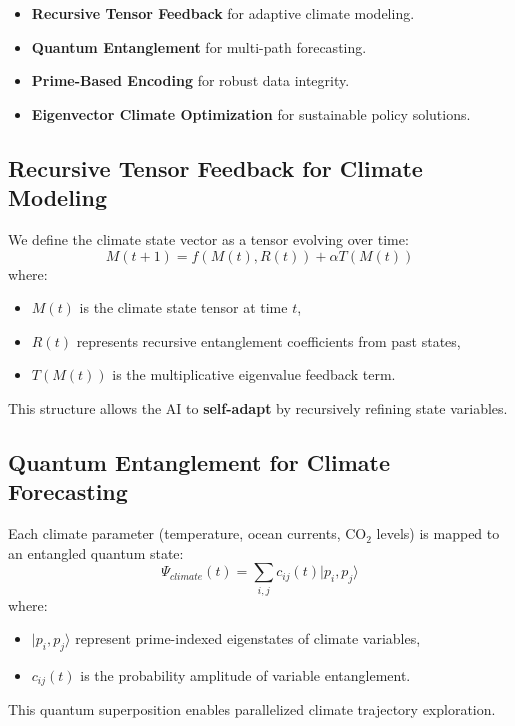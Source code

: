 \documentclass{article}
\theoremstyle{plain}
\begin{document}
\begin{itemize}
\begin{itemize}
\begin{itemize}
    \item \textbf{Recursive Tensor Feedback} for adaptive climate modeling.
    \item \textbf{Quantum Entanglement} for multi-path forecasting.
    \item \textbf{Prime-Based Encoding} for robust data integrity.
    \item \textbf{Eigenvector Climate Optimization} for sustainable policy solutions.
\end{itemize}

\subsection{Recursive Tensor Feedback for Climate Modeling}
We define the climate state vector as a tensor evolving over time:
\begin{equation}
    M(t+1) = f(M(t), R(t)) + \alpha T(M(t))
\end{equation}
where:
\begin{itemize}
    \item \( M(t) \) is the climate state tensor at time \( t \),
    \item \( R(t) \) represents recursive entanglement coefficients from past states,
    \item \( T(M(t)) \) is the multiplicative eigenvalue feedback term.
\end{itemize}

This structure allows the AI to \textbf{self-adapt} by recursively refining state variables.

\subsection{Quantum Entanglement for Climate Forecasting}
Each climate parameter (temperature, ocean currents, CO$_2$ levels) is mapped to an entangled quantum state:
\begin{equation}
    \Psi_{climate}(t) = \sum_{i,j} c_{ij}(t) |p_i, p_j \rangle
\end{equation}
where:
\begin{itemize}
    \item \( |p_i, p_j \rangle \) represent prime-indexed eigenstates of climate variables,
    \item \( c_{ij}(t) \) is the probability amplitude of variable entanglement.
\end{itemize}
This quantum superposition enables parallelized climate trajectory exploration.


\end{itemize}
\end{itemize}
\end{document}
